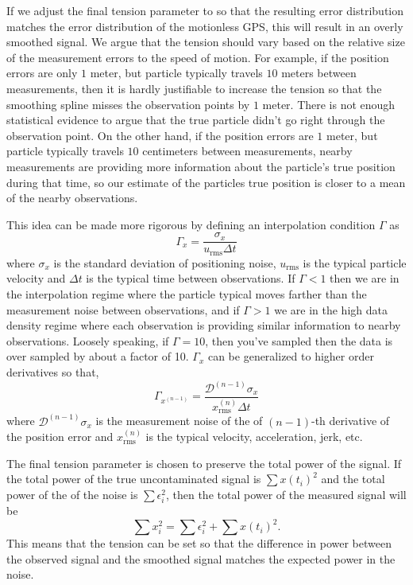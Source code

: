 \documentclass[twocol]{ametsoc}
\begin{document}
If we adjust the final tension parameter to so that the resulting error distribution matches the error distribution of the motionless GPS, this will result in an overly smoothed signal. We argue that the tension should vary based on the relative size of the measurement errors to the speed of motion. For example, if the position errors are only $1$ meter, but particle typically travels $10$ meters between measurements, then it is hardly justifiable to increase the tension so that the smoothing spline misses the observation points by $1$ meter. There is not enough statistical evidence to argue that the true particle didn't go right through the observation point. On the other hand, if the position errors are  $1$ meter, but particle typically travels $10$ centimeters between measurements, nearby measurements are providing more information about the particle's true position during that time, so our estimate of the particles true position is closer to a mean of the nearby observations.

This idea can be made more rigorous by defining an interpolation condition $\Gamma$ as
\begin{equation}
\Gamma_x = \frac{\sigma_x}{u_{\textrm{rms}}\Delta t}
\end{equation}
where $\sigma_x$ is the standard deviation of positioning noise, $u_{\textrm{rms}}$ is the typical particle velocity and $\Delta t$ is the typical time between observations. If $\Gamma<1$ then we are in the interpolation regime where the particle typical moves farther than the measurement noise between observations, and if $\Gamma >1$ we are in the high data density regime where each observation is providing similar information to nearby observations. Loosely speaking, if $\Gamma=10$, then you've sampled then the data is over sampled by about a factor of 10. $\Gamma_x$ can be generalized to higher order derivatives so that,
\begin{equation}
\Gamma_{x^{(n-1)}} = \frac{ \mathcal{D}^{(n-1)} \sigma_x }{x^{(n)}_{\textrm{rms}} \Delta t }
\end{equation}
where $\mathcal{D}^{(n-1)} \sigma_x$ is the measurement noise of the of $(n-1)$-th derivative of the position error and $x^{(n)}_{\textrm{rms}}$ is the typical velocity, acceleration, jerk, etc.

The final tension parameter is chosen to preserve the total power of the signal. If the total power of the true uncontaminated signal is $\sum x(t_i)^2$ and the total power of the of the noise is $\sum \epsilon_i^2$, then the total power of the measured signal will be
\begin{equation}
 \sum x_i^2 = \sum \epsilon_i^2 + \sum x(t_i)^2.
\end{equation}
This means that the tension can be set so that the difference in power between the observed signal and the smoothed signal matches the expected power in the noise.
\end{document}
